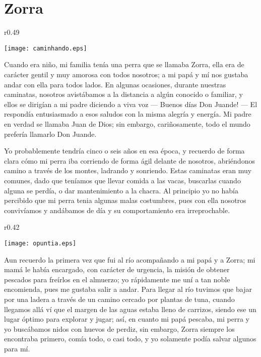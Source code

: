 \cleardoublepage
\newpage
{}
\chapter{Zorra}


\begin{wrapfigure}{r}{0.49\textwidth}
  \begin{center}
  \vspace{-30pt}
    \texttt{[image: caminhando.eps]}
  \end{center}
  \vspace{-20pt}
\end{wrapfigure}
Cuando era niño, mi familia tenía una perra que se llamaba Zorra, ella era de carácter gentil y muy amorosa con todos nosotros; a mi papá y mí nos gustaba andar con ella para todos lados. En algunas ocasiones, durante nuestras caminatas, nosotros avistábamos a la distancia  a algún conocido o familiar, y ellos se dirigían a mi padre diciendo a viva voz --- Buenos días Don Juande! --- El respondía entusiasmado a esos saludos con la misma alegría y energía.
Mi padre en verdad se llamaba Juan de Dios; sin embargo, cariñosamente, todo el mundo prefería llamarlo Don Juande.

Yo probablemente tendría cinco o seis años en esa época, y recuerdo de forma clara cómo mi perra iba corriendo de forma ágil delante de nosotros, abriéndonos camino a través de los montes, ladrando y sonriendo.
Estas caminatas eran muy comunes, dado que teníamos que llevar comida a las vacas, buscarlas cuando alguna se perdía, o dar mantenimiento a la chacra.
Al principio yo no había percibido que mi perra tenia algunas malas costumbres, pues con ella nosotros convivíamos y andábamos de día y su comportamiento era irreprochable.

\begin{wrapfigure}{r}{0.42\textwidth}
  \begin{center}
  \vspace{-30pt}
    \texttt{[image: opuntia.eps]}
  \end{center}
  \vspace{-20pt}
\end{wrapfigure}
Aun recuerdo la primera vez que fui al río acompañando a mi papá y a Zorra; mi mamá le había encargado, con carácter de urgencia, la misión de obtener pescados para freírlos en el almuerzo; yo rápidamente me uní a tan noble encomienda, pues me gustaba salir a andar.
Para llegar al río tuvimos que bajar por una ladera a través de un camino cercado por plantas de tuna, cuando llegamos allá ví que el margen de las aguas estaba lleno de carrizos, siendo ese un lugar óptimo para explorar y jugar; así, en cuanto mi papá pescaba, mi perra y yo buscábamos nidos con huevos de perdiz, sin embargo, Zorra siempre los encontraba primero, comía todo, o casi todo, y yo solamente podía salvar algunos para mí. 

